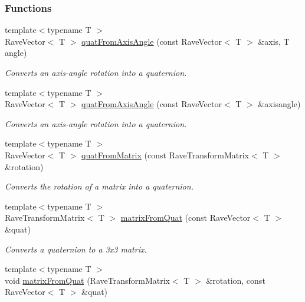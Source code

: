 \subsubsection*{Functions}
\begin{DoxyCompactItemize}
\item 
{\footnotesize template$<$typename T $>$ }\\RaveVector$<$ T $>$ \hyperlink{group__affine__math_ga8a5d9ee6c215ae740e449a8310e4e9d4}{quatFromAxisAngle} (const RaveVector$<$ T $>$ \&axis, T angle)
\begin{DoxyCompactList}\small\item\em Converts an axis-\/angle rotation into a quaternion. \item\end{DoxyCompactList}\item 
{\footnotesize template$<$typename T $>$ }\\RaveVector$<$ T $>$ \hyperlink{group__affine__math_gacf8a968523673f5e3e3c08ffafd75a84}{quatFromAxisAngle} (const RaveVector$<$ T $>$ \&axisangle)
\begin{DoxyCompactList}\small\item\em Converts an axis-\/angle rotation into a quaternion. \item\end{DoxyCompactList}\item 
{\footnotesize template$<$typename T $>$ }\\RaveVector$<$ T $>$ \hyperlink{group__affine__math_gad512ee3ebabb8c45bea16c84ca9ea9d4}{quatFromMatrix} (const RaveTransformMatrix$<$ T $>$ \&rotation)
\begin{DoxyCompactList}\small\item\em Converts the rotation of a matrix into a quaternion. \item\end{DoxyCompactList}\item 
{\footnotesize template$<$typename T $>$ }\\RaveTransformMatrix$<$ T $>$ \hyperlink{group__affine__math_gadee9ddfd3bb8c56e599cf252853ff144}{matrixFromQuat} (const RaveVector$<$ T $>$ \&quat)
\begin{DoxyCompactList}\small\item\em Converts a quaternion to a 3x3 matrix. \item\end{DoxyCompactList}\item 
{\footnotesize template$<$typename T $>$ }\\void \hyperlink{group__affine__math_gacf10676c714b228545f93be252163d76}{matrixFromQuat} (RaveTransformMatrix$<$ T $>$ \&rotation, const RaveVector$<$ T $>$ \&quat)

\end{DoxyCompactItemize}
